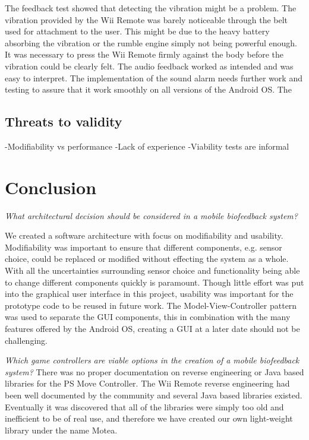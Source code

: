The feedback test showed that detecting the vibration might be a problem. The vibration provided by the Wii Remote was barely noticeable through the belt used for attachment to the user. This might be due to the heavy battery absorbing the vibration or the rumble engine simply not being powerful enough. It was necessary to press the Wii Remote firmly against the body before the vibration could be clearly felt. The audio feedback worked as intended and was easy to interpret. The implementation of the sound alarm needs further work and testing to assure that it work smoothly on all versions of the Android OS.
The

\subsection{Threats to validity}
-Modifiability vs performance
-Lack of experience
-Viability tests are informal


\section{Conclusion}

\textit{What architectural decision should be considered in a mobile biofeedback system?}


We created a software architecture with focus on modifiability and usability. Modifiability was important to ensure that different components, e.g. sensor choice, could be replaced or modified without effecting the system as a whole. With all the uncertainties surrounding sensor choice and functionality being able to change different components quickly is paramount. Though little effort was put into the graphical user interface in this project, usability was important for the prototype code to be reused in future work. The Model-View-Controller pattern was used to separate the GUI components, this in combination with the many features offered by the Android OS, creating a GUI at a later date should not be challenging.

\textit{Which game controllers are viable options in the creation of a mobile biofeedback system?}
There was no proper documentation on reverse engineering or Java based libraries for the PS Move Controller. The Wii Remote reverse engineering had been well documented by the community and several Java based libraries existed. Eventually it was discovered that all of the libraries were simply too old and inefficient to be of real use, and therefore we have created our own light-weight library under the name Motea.


